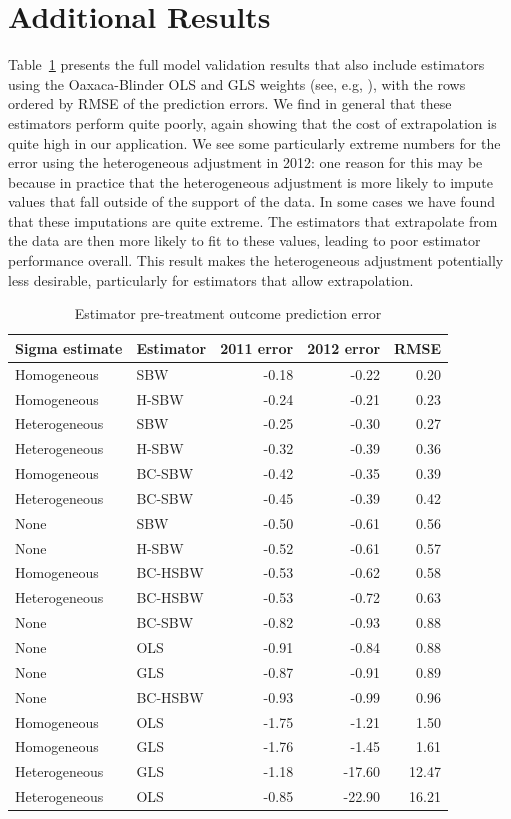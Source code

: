 \section{Additional Results}\label{app:allresults}

Table~\ref{tab:pretxpredfull} presents the full model validation results that also include estimators using the Oaxaca-Blinder OLS and GLS weights (see, e.g, \cite{kline2011oaxaca}), with the rows ordered by RMSE of the prediction errors. We find in general that these estimators perform quite poorly, again showing that the cost of extrapolation is quite high in our application. We see some particularly extreme numbers for the error using the heterogeneous adjustment in 2012: one reason for this may be because in practice that the heterogeneous adjustment is more likely to impute values that fall outside of the support of the data. In some cases we have found that these imputations are quite extreme. The estimators that extrapolate from the data are then more likely to fit to these values, leading to poor estimator performance overall. This result makes the heterogeneous adjustment potentially less desirable, particularly for estimators that allow extrapolation.

\begin{table}[ht]
\caption{Estimator pre-treatment outcome prediction error}\label{tab:pretxpredfull}
\begin{tabular}{llrrr}
  \hline
Sigma estimate & Estimator & 2011 error & 2012 error & RMSE \\ 
  \hline
Homogeneous & SBW & -0.18 & -0.22 & 0.20 \\ 
  Homogeneous & H-SBW & -0.24 & -0.21 & 0.23 \\ 
  Heterogeneous & SBW & -0.25 & -0.30 & 0.27 \\ 
  Heterogeneous & H-SBW & -0.32 & -0.39 & 0.36 \\ 
  Homogeneous & BC-SBW & -0.42 & -0.35 & 0.39 \\ 
  Heterogeneous & BC-SBW & -0.45 & -0.39 & 0.42 \\ 
  None & SBW & -0.50 & -0.61 & 0.56 \\ 
  None & H-SBW & -0.52 & -0.61 & 0.57 \\ 
  Homogeneous & BC-HSBW & -0.53 & -0.62 & 0.58 \\ 
  Heterogeneous & BC-HSBW & -0.53 & -0.72 & 0.63 \\ 
  None & BC-SBW & -0.82 & -0.93 & 0.88 \\ 
  None & OLS & -0.91 & -0.84 & 0.88 \\ 
  None & GLS & -0.87 & -0.91 & 0.89 \\ 
  None & BC-HSBW & -0.93 & -0.99 & 0.96 \\ 
  Homogeneous & OLS & -1.75 & -1.21 & 1.50 \\ 
  Homogeneous & GLS & -1.76 & -1.45 & 1.61 \\ 
  Heterogeneous & GLS & -1.18 & -17.60 & 12.47 \\ 
  Heterogeneous & OLS & -0.85 & -22.90 & 16.21 \\ 
   \hline
\end{tabular}
\end{table}


